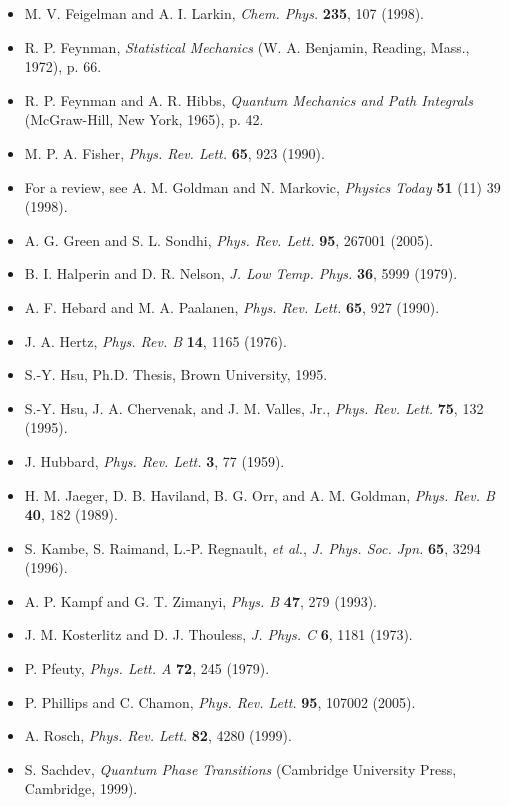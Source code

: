 \begin{itemize}[leftmargin=2em,itemsep=0pt,parsep=0pt,label={}]
\item [FL1998] M. V. Feigelman and A. I. Larkin, \emph{Chem. Phys.} \textbf{235}, 107 (1998).
\item [F1972] R. P. Feynman, \emph{Statistical Mechanics} (W. A. Benjamin, Reading, Mass., 1972), p. 66.
\item [FH1965] R. P. Feynman and A. R. Hibbs, \emph{Quantum Mechanics and Path Integrals} (McGraw-Hill, New York, 1965), p. 42.
\item [F1990] M. P. A. Fisher, \emph{Phys. Rev. Lett.} \textbf{65}, 923 (1990).
\item [GM1998] For a review, see A. M. Goldman and N. Markovic, \emph{Physics Today} \textbf{51} (11) 39 (1998).
\item [GS2005] A. G. Green and S. L. Sondhi, \emph{Phys. Rev. Lett.} \textbf{95}, 267001 (2005).
\item [HN1979] B. I. Halperin and D. R. Nelson, \emph{J. Low Temp. Phys.} \textbf{36}, 5999 (1979).
\item [HP1990] A. F. Hebard and M. A. Paalanen, \emph{Phys. Rev. Lett.} \textbf{65}, 927 (1990).
\item [H1976] J. A. Hertz, \emph{Phys. Rev. B} \textbf{14}, 1165 (1976).
\item [H1995] S.-Y. Hsu, Ph.D. Thesis, Brown University, 1995.
\item [HCV1995] S.-Y. Hsu, J. A. Chervenak, and J. M. Valles, Jr., \emph{Phys. Rev. Lett.} \textbf{75}, 132 (1995).
\item [H1959] J. Hubbard, \emph{Phys. Rev. Lett.} \textbf{3}, 77 (1959).
\item [J1989] H. M. Jaeger, D. B. Haviland, B. G. Orr, and A. M. Goldman, \emph{Phys. Rev. B} \textbf{40}, 182 (1989).
\item [K1996] S. Kambe, S. Raimand, L.-P. Regnault, \emph{et al.}, \emph{J. Phys. Soc. Jpn.} \textbf{65}, 3294 (1996).
\item [KZ1993] A. P. Kampf and G. T. Zimanyi, \emph{Phys. B} \textbf{47}, 279 (1993).
\item [KT1973] J. M. Kosterlitz and D. J. Thouless, \emph{J. Phys. C} \textbf{6}, 1181 (1973).
\item [P1979] P. Pfeuty, \emph{Phys. Lett. A} \textbf{72}, 245 (1979).
\item [PC2005] P. Phillips and C. Chamon, \emph{Phys. Rev. Lett.} \textbf{95}, 107002 (2005).
\item [R1999] A. Rosch, \emph{Phys. Rev. Lett.} \textbf{82}, 4280 (1999).
\item [S1999] S. Sachdev, \emph{Quantum Phase Transitions} (Cambridge University Press, Cambridge, 1999).

\end{itemize}
